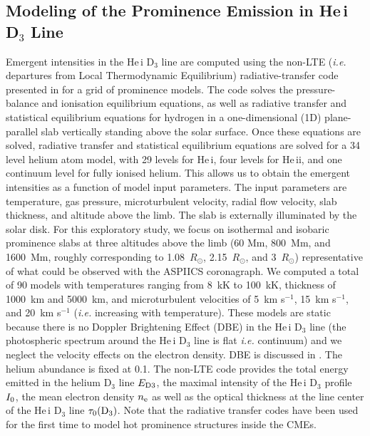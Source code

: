 \documentclass[namedreferences]{solarphysics}
\begin{document}
\begin{article}
  
\section{Modeling of the Prominence Emission in He\,{\sc i} D$_3$ Line}
	\label{s-ed3}

Emergent intensities in the He\,{\sc i} D$_{3}$ line are computed using the non-LTE ({\it i.e.} departures from Local Thermodynamic Equilibrium) 
radiative-transfer code presented in  for a grid of prominence models. 
The code solves the pressure-balance and ionisation 
equilibrium equations, as well as radiative transfer and statistical equilibrium equations for hydrogen in a one-dimensional (1D) plane-parallel slab
vertically standing above the solar surface. 
Once these equations are solved, radiative transfer and statistical equilibrium equations are solved for a 34 level helium atom model, with 29 levels for 
He\,{\sc i}, four levels for He\,{\sc ii}, and one continuum level for fully ionised helium. This allows us to obtain the emergent intensities as a function of 
model input parameters. The input parameters are temperature, gas pressure, microturbulent velocity, radial flow velocity, slab thickness, and altitude 
above the limb. The slab is externally illuminated by the solar disk.
For this exploratory study, we focus on isothermal and isobaric prominence slabs at three altitudes above the limb 
(60 Mm, 800~Mm, and 1600~Mm, roughly corresponding to 1.08~$R_\odot$, 2.15~$R_\odot$, and 3~$R_\odot$) representative of what could be 
observed with the ASPIICS coronagraph. We computed a total of 90 models with temperatures ranging from 8~kK to 100~kK, thickness of 1000~km and 
5000~km, and microturbulent velocities of 5~km s$^{-1}$, 15~km s$^{-1}$, and 20~km s$^{-1}$ ({\it i.e.} increasing with temperature). These models 
are static because there is no Doppler Brightening Effect (DBE) in the He\,{\sc i} D$_{3}$ line (the photospheric spectrum around the He\,{\sc i} D$_{3}$ line 
is flat {\it i.e.} continuum) and we neglect the velocity effects on the electron density.
DBE is discussed in . The helium abundance is fixed at 0.1. The non-LTE code provides the total energy emitted in the helium D$_{3}$ 
line $E_{\rm D3}$, the maximal intensity of the He\,{\sc i} D$_{3}$ profile $I_{\rm 0}$, the mean electron density $n_{\rm e}$ as well as the optical 
thickness at the line center of the He\,{\sc i} D$_{3}$ line $\tau_{0}(\rm D_{3})$. Note that the radiative transfer codes have been used for the 
first time to model hot prominence structures inside the CMEs.


\end{article}
\end{document}
